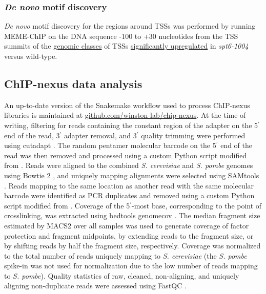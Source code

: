 \subsubsection{\textit{De novo} motif discovery}
\label{subsubsec:denovo_motif_discovery}

\textit{De novo} motif discovery for the regions around TSSs was performed by running MEME-ChIP \citep{machanick2011} on the DNA sequence -100 to +30 nucleotides from the TSS summits of the \hyperref[subsubsec:tss_peak_classification]{genomic classes} of TSSs \hyperref[subsubsec:tss_differential_expression]{significantly upregulated} in \textit{spt6-1004} versus wild-type.

\subsection{ChIP-nexus data analysis}
\label{subsec:chipnexus}
An up-to-date version of the Snakemake \citep{koster2012} workflow used to process ChIP-nexus libraries is maintained at \href{https://github.com/winston-lab/chip-nexus}{github.com/winston-lab/chip-nexus}.
At the time of writing, filtering for reads containing the constant region of the adapter on the 5$^\prime$ end of the read, 3$^\prime$ adapter removal, and 3$^\prime$ quality trimming were performed using cutadapt \citep{martin2011}.
The random pentamer molecular barcode on the 5$^\prime$ end of the read was then removed and processed using a custom Python script modified from \citet{mayer2015}.
Reads were aligned to the combined \textit{S. cerevisiae} and \textit{S. pombe} genomes using Bowtie 2 \citep{langmead2012}, and uniquely mapping alignments were selected using SAMtools \citep{li2009}.
Reads mapping to the same location as another read with the same molecular barcode were identified as PCR duplicates and removed using a custom Python script modified from \citet{mayer2015}.
Coverage of the 5$^\prime$-most base, corresponding to the point of crosslinking, was extracted using bedtools genomecov \citep{quinlan2010}.
The median fragment size estimated by MACS2 \citep{zhang2008} over all samples was used to generate coverage of factor protection and fragment midpoints, by extending reads to the fragment size, or by shifting reads by half the fragment size, respectively.
Coverage was normalized to the total number of reads uniquely mapping to \textit{S. cerevisiae} (the \textit{S. pombe} spike-in was not used for normalization due to the low number of reads mapping to \textit{S. pombe}).
Quality statistics of raw, cleaned, non-aligning, and uniquely aligning non-duplicate reads were assessed using FastQC \citep{andrews2010}.

